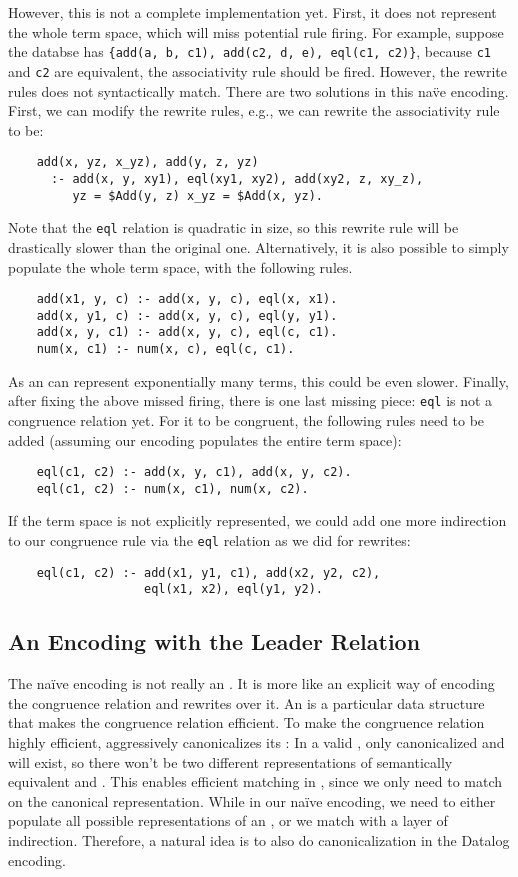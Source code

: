 However, this is not a complete \egraph implementation yet.
First, it does not represent the whole term space, 
 which will miss potential rule firing.
For example, suppose the databse has \verb|{add(a, b, c1), add(c2, d, e), eql(c1, c2)}|,
 because \verb|c1| and \verb|c2| are equivalent, 
 the associativity rule should be fired.
However, the rewrite rules does not syntactically match.
There are two solutions in this na\"ve encoding.
First, we can modify the rewrite rules, e.g.,
 we can rewrite the associativity rule to be:
\begin{verbatim}
    add(x, yz, x_yz), add(y, z, yz) 
      :- add(x, y, xy1), eql(xy1, xy2), add(xy2, z, xy_z), 
         yz = $Add(y, z) x_yz = $Add(x, yz).
\end{verbatim}
Note that the \verb|eql| relation is quadratic in size,
 so this rewrite rule will be drastically slower than the original one.
Alternatively,
 it is also possible to simply populate the whole term space, with the following rules.
\begin{verbatim}
    add(x1, y, c) :- add(x, y, c), eql(x, x1).
    add(x, y1, c) :- add(x, y, c), eql(y, y1).
    add(x, y, c1) :- add(x, y, c), eql(c, c1).
    num(x, c1) :- num(x, c), eql(c, c1).
\end{verbatim}
As an \egraph can represent exponentially many terms,
 this could be even slower.
Finally, after fixing the above missed firing, there is one last missing piece:
 \verb|eql| is not a congruence relation yet.
For it to be congruent,
 the following rules need to be added (assuming our encoding populates the entire term space):
\begin{verbatim}
    eql(c1, c2) :- add(x, y, c1), add(x, y, c2).
    eql(c1, c2) :- num(x, c1), num(x, c2).
\end{verbatim}
If the term space is not explicitly represented,
 we could add one more indirection to our congruence rule 
 via the \verb|eql| relation as
 we did for rewrites:
\begin{verbatim}
    eql(c1, c2) :- add(x1, y1, c1), add(x2, y2, c2),
                   eql(x1, x2), eql(y1, y2).
\end{verbatim}

\subsection{An Encoding with the Leader Relation}\label{sec:leader}

The na\"ive encoding is not really an \egraph.
It is more like an explicit way of encoding the congruence relation
 and rewrites over it.
An \egraph is a particular data structure that 
 makes the congruence relation efficient.
To make the congruence relation highly efficient,
 \egraph aggressively canonicalizes its \enodes:
In a valid \egraph,
 only canonicalized \enodes and \eclass will exist,
 so there won't be two different representations of 
 semantically equivalent \enodes and \eclasses.
This enables efficient matching in \egraph, 
 since we only need to match on the canonical representation.
While in our na\"ive encoding, 
 we need to either populate all possible representations of an \enode,
 or we match with a layer of indirection.
Therefore, 
 a natural idea is to also do canonicalization in the Datalog encoding.

